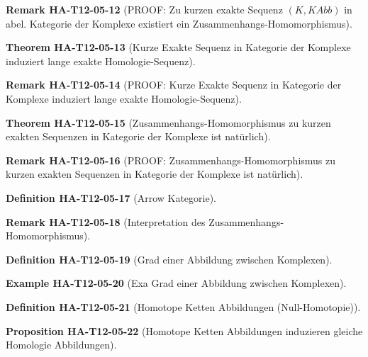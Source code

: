 \documentclass[10pt, letterpaper]{article}
\newcommand{\CustomHeading}[3]{%
  \par\medskip\noindent%
  \textbf{#1 #2} \textnormal{(#3)}.\enskip%
}
\newenvironment{DEF}[2]{\CustomHeading{Definition}{#1}{#2}}{}
\newenvironment{PROP}[2]{\CustomHeading{Proposition}{#1}{#2}}{}
\newenvironment{THEO}[2]{\CustomHeading{Theorem}{#1}{#2}}{}
\newenvironment{REM}[2]{\CustomHeading{Remark}{#1}{#2}}{}
\newenvironment{EXA}[2]{\CustomHeading{Example}{#1}{#2}}{}
\begin{document}
\begin{REM}{HA-T12-05-12}{PROOF: Zu kurzen exakte Sequenz $(K,KAbb)$ in abel. Kategorie der Komplexe existiert ein Zusammenhangs-Homomorphismus}
\end{REM}

\begin{THEO}{HA-T12-05-13}{Kurze Exakte Sequenz in Kategorie der Komplexe induziert lange exakte Homologie-Sequenz}
\end{THEO}

\begin{REM}{HA-T12-05-14}{PROOF: Kurze Exakte Sequenz in Kategorie der Komplexe induziert lange exakte Homologie-Sequenz}
\end{REM}

\begin{THEO}{HA-T12-05-15}{Zusammenhangs-Homomorphismus zu kurzen exakten Sequenzen in Kategorie der Komplexe ist natürlich}
\end{THEO}

\begin{REM}{HA-T12-05-16}{PROOF: Zusammenhangs-Homomorphismus zu kurzen exakten Sequenzen in Kategorie der Komplexe ist natürlich}
\end{REM}

\begin{DEF}{HA-T12-05-17}{Arrow Kategorie}
\end{DEF}

\begin{REM}{HA-T12-05-18}{Interpretation des Zusammenhangs-Homomorphismus}
\end{REM}

\begin{DEF}{HA-T12-05-19}{Grad einer Abbildung zwischen Komplexen}
\end{DEF}

\begin{EXA}{HA-T12-05-20}{Exa Grad einer Abbildung zwischen Komplexen}
\end{EXA}

\begin{DEF}{HA-T12-05-21}{Homotope Ketten Abbildungen (Null-Homotopie)}
\end{DEF}

\begin{PROP}{HA-T12-05-22}{Homotope Ketten Abbildungen induzieren gleiche Homologie Abbildungen}
\end{PROP}
\end{document}

